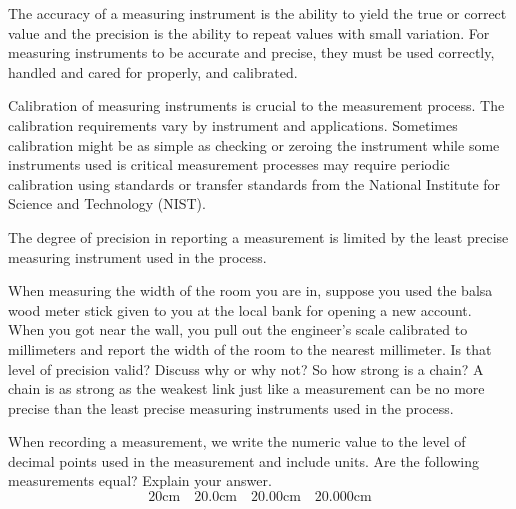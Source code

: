 \documentclass{ximera}
\begin{document}
The accuracy of a measuring instrument is the ability to yield the true or correct value and the precision is the ability to repeat values with small variation. For measuring instruments to be accurate and precise, they must be used correctly, handled and cared for properly, and calibrated. 

Calibration of measuring instruments is crucial to the measurement process. The calibration requirements vary by instrument and applications. Sometimes calibration might be as simple as checking or zeroing the instrument while some instruments used is critical measurement processes may require periodic calibration using standards or transfer standards from the National Institute for Science and Technology (NIST).
    
The degree of precision in reporting a measurement is limited by the least precise measuring instrument used in the process. 
\begin{question}\label{q:lengthOfRoom}
When measuring the width of the room you are in, suppose you used the balsa wood meter stick given to you at the local bank for opening a new account.  When you got near the wall, you pull out the engineer’s scale calibrated to millimeters and report the width of the room to the nearest millimeter.  Is that level of precision valid?  Discuss why or why not?   So how strong is a chain?  A chain is as strong as the weakest link just like a measurement can be no more precise than the least precise measuring instruments used in the process. 
\end{question}

\begin{question}\label{q:equalLength}
When recording a measurement, we write the numeric value to the level of decimal points used in the measurement and include units. Are the following measurements equal?  Explain your answer.   
$$20\text{cm}\quad 20.0\text{cm}\quad 20.00\text{cm}\quad 20.000\text{cm} $$

\begin{multipleChoice} 
\end{multipleChoice} 
\end{question}
\end{document}
